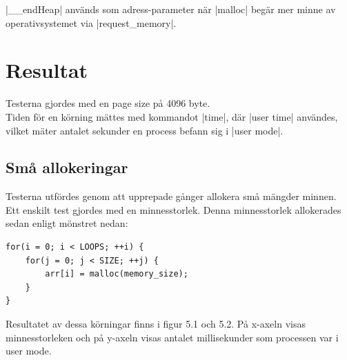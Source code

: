 \documentclass[paper=a4, fontsize=11pt]{scrartcl} %
\numberwithin{equation}{section} %
\numberwithin{figure}{section} %
\numberwithin{table}{section} %
\begin{document}
|__endHeap| används som adress-parameter när |malloc| begär mer minne av operativsystemet via |request_memory|.




\section{Resultat}

Testerna gjordes med en page size på 4096 byte.\\
Tiden för en körning mättes med kommandot |time|, där |user time| användes, vilket mäter antalet sekunder en process
befann sig i |user mode|.

\subsection{Små allokeringar}

Testerna utfördes genom att upprepade gånger allokera små mängder minnen.
Ett enskilt test gjordes med en minnesstorlek. Denna minnesstorlek allokerades sedan enligt mönstret nedan:

\begin{verbatim}
for(i = 0; i < LOOPS; ++i) {
    for(j = 0; j < SIZE; ++j) {
        arr[i] = malloc(memory_size);
    }
}
\end{verbatim}

Resultatet av dessa körningar finns i figur 5.1 och 5.2. På x-axeln visas minnesstorleken och på y-axeln visas antalet millisekunder som processen var i user mode.
\end{document}

